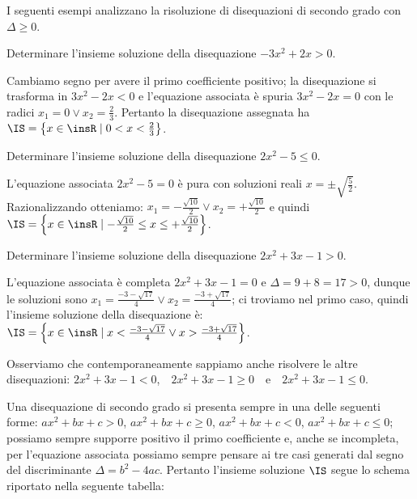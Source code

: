 I seguenti esempi analizzano la risoluzione di disequazioni di secondo grado con $\Delta \ge 0$.
\begin{exrig}
\begin{esempio}
Determinare l'insieme soluzione della disequazione $-3x^2+2x>0$.

Cambiamo segno per avere il primo coefficiente positivo; la disequazione si trasforma in $3x^2-2x<0$ e l'equazione associata è spuria $3x^2-2x=0$ con le radici $x_1=0\vee x_2=\frac 2 3$. Pertanto la disequazione assegnata ha $\IS=\left\{x\in \insR \mid 0<x<\frac 2 3\right\}$.
\end{esempio}

\begin{esempio}
Determinare l'insieme soluzione della disequazione $2x^2-5\le 0$.

L'equazione associata $2x^2-5=0$ è pura con soluzioni reali $x=\pm \sqrt{\frac 5 2}$. Razionalizzando otteniamo: $x_1=-\frac{\sqrt{10}} 2\vee x_2=+\frac{\sqrt{10}} 2$ e quindi $\IS=\left\{x\in \insR \mid -\frac{\sqrt{10}} 2\le x\le +\frac{\sqrt{10}} 2\right\}$.
\end{esempio}

\begin{esempio}
Determinare l'insieme soluzione della disequazione $2x^2+3x-1>0$.

L'equazione associata è completa $2x^2+3x-1=0$ e $\Delta =9+8=17>0$, dunque le soluzioni sono $x_1=\frac{-3-\sqrt{17}} 4\vee x_2=\frac{-3+\sqrt{17}} 4$; ci troviamo nel primo caso, quindi l'insieme soluzione della disequazione è: $\IS=\left\{x\in \insR \mid x<\frac{-3-\sqrt{17}} 4\vee x>\frac{-3+\sqrt{17}} 4\right\}$.

Osserviamo che contemporaneamente sappiamo anche risolvere le altre disequazioni: $2x^2+3x-1<0$,~~$2x^2+3x-1\ge 0$~~e~~$2x^2+3x-1\le 0$.
\end{esempio}
\end{exrig}
\conclusione Una disequazione di secondo grado si presenta sempre in una delle seguenti forme: ${ax}^2+{bx}+c>0$, ${ax}^2+{bx}+c\ge 0$, ${ax}^2+{bx}+c<0$, ${ax}^2+{bx}+c\le 0$; possiamo sempre supporre positivo il primo coefficiente e, anche se incompleta, per l'equazione associata possiamo sempre pensare ai tre casi generati dal segno del discriminante $\Delta =b^2-4{ac}$. Pertanto l'insieme soluzione $\IS$ segue lo schema riportato nella seguente tabella:
